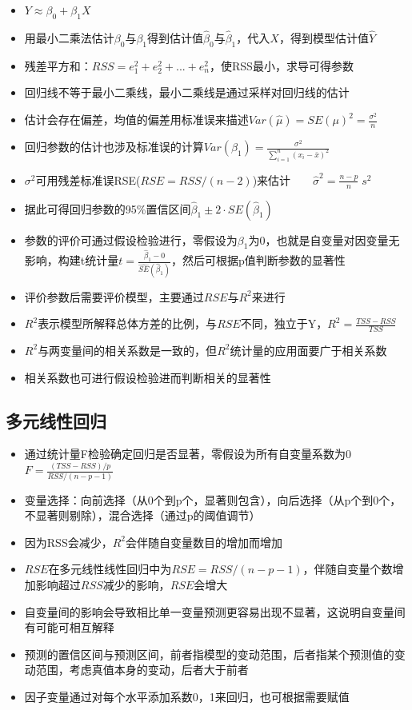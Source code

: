 \documentclass[]{book}
\providecommand{\tightlist}{%
  \setlength{\itemsep}{0pt}\setlength{\parskip}{0pt}}
\begin{document}
\begin{itemize}
\tightlist
\item
  \(Y \approx \beta_0 + \beta_1 X\)
\item
  用最小二乘法估计\(\beta_0\)与\(\beta_1\)得到估计值\(\hat \beta_0\)与\(\hat \beta_1\)，代入\(X\)，得到模型估计值\(\hat Y\)
\item
  残差平方和：\(RSS = e_1^2 + e_2^2 + ... + e_n^2\)，使RSS最小，求导可得参数
\item
  回归线不等于最小二乘线，最小二乘线是通过采样对回归线的估计
\item
  估计会存在偏差，均值的偏差用标准误来描述\(Var(\hat \mu) = SE(\mu)^2 = \frac{\sigma^2}{n}\)
\item
  回归参数的估计也涉及标准误的计算\(Var(\beta_{1}) = \frac{\sigma^2}{\sum_{i=1}^n{(x_i - \bar{x})^2}}\)
\item
  \(\sigma^2\)可用残差标准误RSE(\(RSE = RSS/(n − 2)\))来估计\(\qquad\hat\sigma^2 = \frac{n-p}{n}\;s^2\)
\item
  据此可得回归参数的95\%置信区间\(\hat \beta_1 ± 2 \cdot SE(\hat \beta_1)\)
\item
  参数的评价可通过假设检验进行，零假设为\(\beta_1\)为0，也就是自变量对因变量无影响，构建t统计量\(t = \frac{\hat \beta_1 - 0}{\hat {SE}(\hat \beta_1)}\)，然后可根据p值判断参数的显著性
\item
  评价参数后需要评价模型，主要通过\(RSE\)与\(R^2\)来进行
\item
  \(R^2\)表示模型所解释总体方差的比例，与\(RSE\)不同，独立于Y，\(R^2 = \frac{TSS - RSS}{TSS}\)
\item
  \(R^2\)与两变量间的相关系数是一致的，但\(R^2\)统计量的应用面要广于相关系数
\item
  相关系数也可进行假设检验进而判断相关的显著性
\end{itemize}

\hypertarget{ux591aux5143ux7ebfux6027ux56deux5f52}{%
\subsection{多元线性回归}\label{ux591aux5143ux7ebfux6027ux56deux5f52}}

\begin{itemize}
\tightlist
\item
  通过统计量F检验确定回归是否显著，零假设为所有自变量系数为0 \(F = \frac{(TSS - RSS)/p}{RSS/(n-p-1)}\)
\item
  变量选择：向前选择（从0个到p个，显著则包含），向后选择（从p个到0个，不显著则剔除），混合选择（通过p的阈值调节）
\item
  因为RSS会减少，\(R^2\)会伴随自变量数目的增加而增加
\item
  \(RSE\)在多元线性线性回归中为\(RSE = RSS/(n − p - 1)\)，伴随自变量个数增加影响超过\(RSS\)减少的影响，\(RSE\)会增大
\item
  自变量间的影响会导致相比单一变量预测更容易出现不显著，这说明自变量间有可能可相互解释
\item
  预测的置信区间与预测区间，前者指模型的变动范围，后者指某个预测值的变动范围，考虑真值本身的变动，后者大于前者
\item
  因子变量通过对每个水平添加系数0，1来回归，也可根据需要赋值
\end{itemize}
\end{document}

